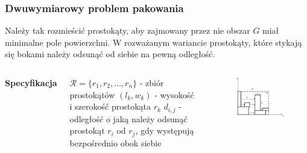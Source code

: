 \documentclass{beamer}
\begin{document}
\begin{frame}
    \frametitle{Dwuwymiarowy problem pakowania}
    Należy tak rozmieścić prostokąty, aby zajmowany przez nie obszar $G$ miał minimalne pole powierzchni. W rozważanym wariancie prostokąty, które stykają się bokami należy odsunąć
    od siebie na pewną odległość.
   
    \begin{columns}[c]
        
        \textbf{Specyfikacja}
        \begin{outline}
            \1 $\mathcal{R}=\{r_1,r_2,\dots,r_n \}$ - zbiór prostokątów
            \1 $(l_k,w_k)$ - wysokość i szerokość prostokąta $r_k$
            \1 $d_{i,j}$ - odległość o jaką należy odsunąć prostokąt $r_i$ od $r_j$,
            gdy występują bezpośrednio obok siebie
        \end{outline}
        
         \begin{figure}[prostokaty]
             \centering
             \includegraphics[scale=0.5]{diagram_prostokaty}
         \end{figure}
        
    \end{columns}
\end{frame}
\end{document}
